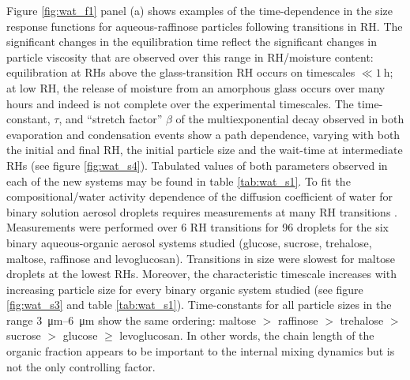  Figure \ref{fig:wat_f1} panel (a) shows examples of the time-dependence in the size response functions for aqueous-raffinose particles following transitions in RH. The significant changes in the equilibration time reflect the significant changes in particle viscosity that are observed over this range in RH/moisture content: equilibration at RHs above the glass-transition RH occurs on timescales $\ll \SI{1}{\hour}$; at low RH, the release of moisture from an amorphous glass occurs over many hours and indeed is not complete over the experimental timescales. The time-constant, $\tau$, and ``stretch factor” $\beta$ of the multiexponential decay observed in both evaporation and condensation events show a path dependence, varying with both the initial and final RH, the initial particle size and the wait-time at intermediate RHs (see figure \ref{fig:wat_s4}). Tabulated values of both parameters observed in each of the new systems may be found in table \ref{tab:wat_s1}. To fit the compositional/water activity dependence of the diffusion coefficient of water for binary solution aerosol droplets requires measurements at many RH transitions \cite{Ingram2017,Rickards2015}.
Measurements were performed over \num{6} RH transitions for \num{96} droplets for the six binary aqueous-organic aerosol systems studied (glucose, sucrose, trehalose, maltose, raffinose and levoglucosan). Transitions in size were slowest for maltose droplets at the lowest RHs. Moreover, the characteristic timescale increases with increasing particle size for every binary organic system studied (see figure \ref{fig:wat_s3} and table \ref{tab:wat_s1}). Time-constants for all particle sizes in the range \SIrange{3}{6}{\micro\meter} show the same ordering: maltose $>$ raffinose $>$ trehalose $>$ sucrose $>$ glucose $\ge$ levoglucosan. In other words, the chain length of the organic fraction appears to be important to the internal mixing dynamics but is not the only controlling factor.

